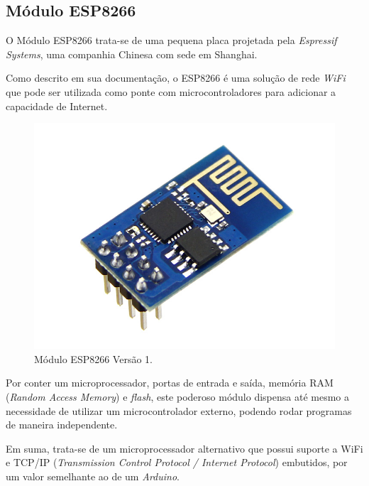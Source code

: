 \documentclass[
    12pt,               %
    openright,          %
    oneside,
    a4paper,            
    english,            %
    brazil              %
    ]{abntex2}
\begin{document}
\subsection{Módulo ESP8266}

O Módulo ESP8266 trata-se de uma pequena placa projetada pela \textit{Espressif Systems}, uma companhia Chinesa com sede em Shanghai.

Como descrito em sua documentação, o ESP8266 é uma solução de rede \textit{WiFi} que pode ser utilizada como ponte com microcontroladores para adicionar a capacidade de Internet.

\begin{figure}[!htb]
  \begin{center}
    \caption{\label{esp-mod}Módulo ESP8266 Versão 1.}
    \includegraphics[scale=0.22]{images/esp.jpg}
  \end{center}
\end{figure}

Por conter um microprocessador, portas de entrada e saída, memória RAM (\textit{Random Access Memory}) e \textit{flash}, este poderoso módulo dispensa até mesmo a necessidade de utilizar um microcontrolador externo, podendo rodar programas de maneira independente. 

Em suma, trata-se de um microprocessador alternativo que possui suporte a WiFi e TCP/IP (\textit{Transmission Control Protocol / Internet Protocol}) embutidos, por um valor semelhante ao de um \textit{Arduino}.
\end{document}
